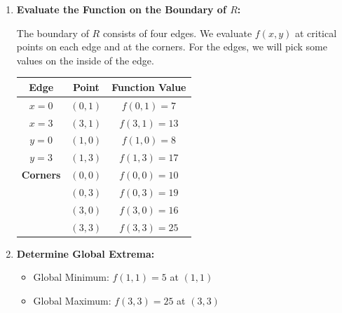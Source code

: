 \begin{example}
\begin{solution}
\begin{enumerate}
            \item \textbf{Evaluate the Function on the Boundary of \( R \):}
            
            The boundary of \( R \) consists of four edges. We evaluate \( f(x,y) \) at critical points on each edge and at the corners. For the edges, we will pick some values on the inside of the edge.
            
            \begin{center}
                \begin{tabular}{|c|c|c|}
                    \hline
                    \textbf{Edge} & \textbf{Point} & \textbf{Function Value} \\
                    \hline
                    \( x = 0 \) & \( (0,1) \) & \( f(0,1) = 7 \) \\
                    \hline
                    \( x = 3 \) & \( (3,1) \) & \( f(3,1) = 13 \) \\
                    \hline
                    \( y = 0 \) & \( (1,0) \) & \( f(1,0) = 8 \) \\
                    \hline
                    \( y = 3 \) & \( (1,3) \) & \( f(1,3) = 17 \) \\
                    \hline
                    \textbf{Corners} & \( (0,0) \) & \( f(0,0) = 10 \) \\
                    \hline
                    & \( (0,3) \) & \( f(0,3) = 19 \) \\
                    \hline
                    & \( (3,0) \) & \( f(3,0) = 16 \) \\
                    \hline
                    & \( (3,3) \) & \( f(3,3) = 25 \) \\
                    \hline
                \end{tabular}
            \end{center}
            
            \item \textbf{Determine Global Extrema:}
            
            \begin{itemize}
                \item Global Minimum: \( f(1,1) = 5 \) at \( (1, 1) \)
                \item Global Maximum: \( f(3,3) = 25 \) at \( (3, 3) \)
            \end{itemize}
        \end{enumerate}
        

\end{solution}
\end{example}
